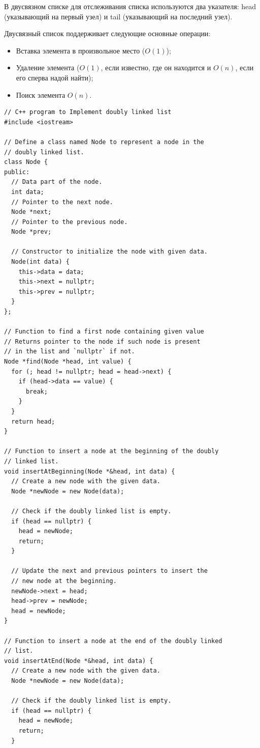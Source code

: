 В двусвязном списке для отслеживания списка используются два указателя: head (указывающий на первый узел) и tail (указывающий на последний узел).

Двусвязный список поддерживает следующие основные операции:
\begin{itemize}
    \item Вставка элемента в произвольное место ($O(1)$);
    \item Удаление элемента ($O(1)$, если известно, где он находится и $O(n)$, если его сперва надой найти);
    \item Поиск элемента $O(n)$.
\end{itemize}

\begin{verbatim}
// C++ program to Implement doubly linked list
#include <iostream>

// Define a class named Node to represent a node in the
// doubly linked list.
class Node {
public:
  // Data part of the node.
  int data;
  // Pointer to the next node.
  Node *next;
  // Pointer to the previous node.
  Node *prev;

  // Constructor to initialize the node with given data.
  Node(int data) {
    this->data = data;
    this->next = nullptr;
    this->prev = nullptr;
  }
};

// Function to find a first node containing given value
// Returns pointer to the node if such node is present
// in the list and `nullptr` if not.
Node *find(Node *head, int value) {
  for (; head != nullptr; head = head->next) {
    if (head->data == value) {
      break;
    }
  }
  return head;
}
    
// Function to insert a node at the beginning of the doubly
// linked list.
void insertAtBeginning(Node *&head, int data) {
  // Create a new node with the given data.
  Node *newNode = new Node(data);

  // Check if the doubly linked list is empty.
  if (head == nullptr) {
    head = newNode;
    return;
  }

  // Update the next and previous pointers to insert the
  // new node at the beginning.
  newNode->next = head;
  head->prev = newNode;
  head = newNode;
}

// Function to insert a node at the end of the doubly linked
// list.
void insertAtEnd(Node *&head, int data) {
  // Create a new node with the given data.
  Node *newNode = new Node(data);

  // Check if the doubly linked list is empty.
  if (head == nullptr) {
    head = newNode;
    return;
  }


\end{verbatim}
